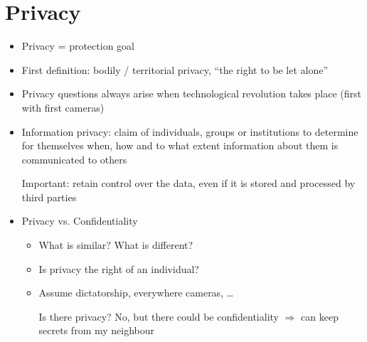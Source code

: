 \documentclass[a4paper,12pt]{scrartcl}
\begin{document}
\section{Privacy}
\begin{itemize}
	\item
		Privacy = protection goal
	\item
		First definition: bodily / territorial privacy, \enquote{the right to be let alone}
	\item
		Privacy questions always arise when technological revolution takes place (first with first cameras)
	\item
		Information privacy: claim of individuals, groups or institutions to determine for themselves when, how and to what extent information about them is communicated to others

		Important: retain control over the data, even if it is stored and processed by third parties
	\item
		Privacy vs. Confidentiality
		\begin{itemize}
			\item
				What is similar? What is different?
			\item
				Is privacy the right of an individual?
			\item
				Assume dictatorship, everywhere cameras, \dots

				Is there privacy? No, but there could be confidentiality $\Rightarrow$ can keep secrets from my neighbour


\end{itemize}
\end{itemize}
\end{document}
